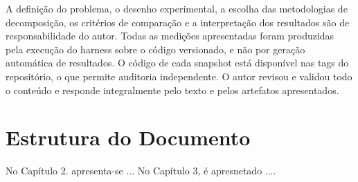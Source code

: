A definição do problema, o desenho experimental, a escolha das metodologias de decomposição, os critérios de comparação e a interpretação dos resultados são de responsabilidade do autor. Todas as medições apresentadas foram produzidas pela execução do harness sobre o código versionado, e não por geração automática de resultados. O código de cada snapshot está disponível nas tags do repositório, o que permite auditoria independente. O autor revisou e validou todo o conteúdo e responde integralmente pelo texto e pelos artefatos apresentados.

\section{Estrutura do Documento}

No Capítulo 2. apresenta-se ...
No Capítulo 3, é apresnetado ....

